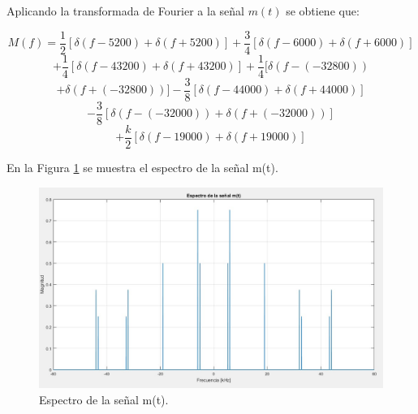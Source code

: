 Aplicando la transformada de Fourier a la señal $m(t)$ se obtiene que:

    \[
        M(f) = \frac{1}{2}[\delta(f - 5200) + \delta(f + 5200)] + \frac{3}{4}[\delta(f - 6000) + \delta(f + 6000)] 
    \]
    \[
        + \frac{1}{4}[\delta(f - 43200) + \delta(f + 43200)] + \frac{1}{4}[\delta(f - (-32800))
    \]
    \[
         + \delta(f + (-32800))] - \frac{3}{8}[\delta(f - 44000) + \delta(f + 44000)]
    \]
    \[
        - \frac{3}{8}[\delta(f - (-32000)) + \delta(f + (-32000))] 
    \]
    \[
     + \frac{k}{2}[\delta(f - 19000) + \delta(f + 19000)]
    \]

En la Figura \ref{fig:espectro_ej12} se muestra el espectro de la señal m(t).

    \begin{figure}[H]
        \centering
        \includegraphics[width=0.8\linewidth]{imagenes/Parte_2/Actividad_12/ejercicio_12.jpg}
        \caption{Espectro de la señal m(t).}
        \label{fig:espectro_ej12}
    \end{figure}
